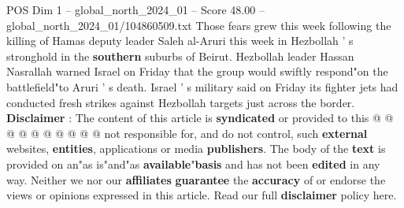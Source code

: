 \begin{textsample}{POS Dim 1 – global\_north\_2024\_01 – Score 48.00 – global\_north\_2024\_01/104860509.txt}
Those fears grew this week following the killing of Hamas deputy leader Saleh al-Aruri this week in Hezbollah ' s stronghold in the \textbf{southern} suburbs of Beirut.
Hezbollah leader Hassan Nasrallah warned Israel on Friday that the group would swiftly respond"on the battlefield"to Aruri ' s death.
Israel ' s military said on Friday its fighter jets had conducted fresh strikes against Hezbollah targets just across the border. \textbf{Disclaimer} : The content of this article is \textbf{syndicated} or provided to this @ @ @ @ @ @ @ @ @ @ not responsible for, and do not control, such \textbf{external} websites, \textbf{entities}, applications or media \textbf{publishers}.
The body of the \textbf{text} is provided on an"as is"and"as \textbf{available}"\textbf{basis} and has not been \textbf{edited} in any way.
Neither we nor our \textbf{affiliates} \textbf{guarantee} the \textbf{accuracy} of or endorse the views or opinions expressed in this article.
Read our full \textbf{disclaimer} policy here.

\end{textsample}
